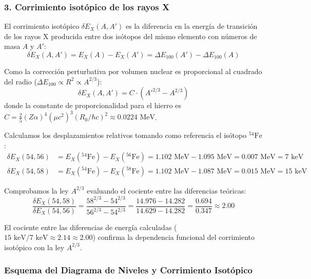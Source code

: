 \begin{problema}
\subsubsection*{3. Corrimiento isotópico de los rayos X}

El corrimiento isotópico $\delta E_X(A, A')$ es la diferencia en la energía de transición de los rayos X producida entre dos isótopos del mismo elemento con números de masa $A$ y $A'$:
\begin{equation*}
\delta E_X(A, A') = E_X(A) - E_X(A') = \Delta E_{100}(A') - \Delta E_{100}(A)
\end{equation*}

Como la corrección perturbativa por volumen nuclear es proporcional al cuadrado del radio ($\Delta E_{100} \propto R^2 \propto A^{2/3}$):
\begin{equation*}
\delta E_X(A, A') = C \cdot \left( A'^{2/3} - A^{2/3} \right)
\end{equation*}
donde la constante de proporcionalidad para el hierro es $C = \frac{2}{5} (Z \alpha)^4 (\mu c^2)^3 (R_0 / \hbar c)^2 \approx 0.0224\text{ MeV}$.

Calculamos los desplazamientos relativos tomando como referencia el isótopo ${}^{54}\text{Fe}$:
\begin{align*}
\delta E_X(54, 56) &= E_X({}^{54}\text{Fe}) - E_X({}^{56}\text{Fe}) = 1.102\text{ MeV} - 1.095\text{ MeV} = 0.007\text{ MeV} = 7\text{ keV} \\
\delta E_X(54, 58) &= E_X({}^{54}\text{Fe}) - E_X({}^{58}\text{Fe}) = 1.102\text{ MeV} - 1.087\text{ MeV} = 0.015\text{ MeV} = 15\text{ keV}
\end{align*}

Comprobamos la ley $A^{2/3}$ evaluando el cociente entre las diferencias teóricas:
\begin{equation*}
\frac{\delta E_X(54, 58)}{\delta E_X(54, 56)} = \frac{58^{2/3} - 54^{2/3}}{56^{2/3} - 54^{2/3}} = \frac{14.976 - 14.282}{14.629 - 14.282} = \frac{0.694}{0.347} \approx 2.00
\end{equation*}

El cociente entre las diferencias de energía calculadas ($15\text{ keV} / 7\text{ keV} \approx 2.14 \approx 2.00$) confirma la dependencia funcional del corrimiento isotópico con la ley $A^{2/3}$.

\subsubsection*{Esquema del Diagrama de Niveles y Corrimiento Isotópico}


\end{problema}
